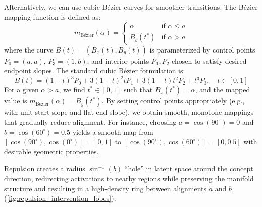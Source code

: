 Alternatively, we can use cubic Bézier curves for smoother transitions. The Bézier mapping function is defined as:
%
\begin{equation}
    m_{\text{Bézier}}(\alpha) =
    \begin{cases}
        \alpha & \text{if } \alpha \leq a \\
        B_y(t^*) & \text{if } \alpha > a
    \end{cases} \label{eq:bezier_mapping_detailed}
\end{equation}
%
where the curve $B(t) = (B_x(t), B_y(t))$ is parameterized by control points $P_0 = (a, a)$, $P_3 = (1, b)$, and interior points $P_1, P_2$ chosen to satisfy desired endpoint slopes. The standard cubic Bézier formulation is:
%
\begin{equation}
    B(t) = (1-t)^3 P_0 + 3(1-t)^2 t P_1 + 3(1-t) t^2 P_2 + t^3 P_3, \quad t \in [0,1] \label{eq:bezier_curve}
\end{equation}
%
For a given $\alpha > a$, we find $t^* \in [0,1]$ such that $B_x(t^*) = \alpha$, and the mapped value is $m_{\text{Bézier}}(\alpha) = B_y(t^*)$. By setting control points appropriately (e.g., with unit start slope and flat end slope), we obtain smooth, monotone mappings that gradually reduce alignment. For instance, choosing $a = \cos(90^\circ) = 0$ and $b = \cos(60^\circ) = 0.5$ yields a smooth map from $[\cos(90^\circ), \cos(0^\circ)] = [0,1]$ to $[\cos(90^\circ), \cos(60^\circ)] = [0, 0.5]$ with desirable geometric properties.

Repulsion creates a radius $\sin^{-1}(b)$ ``hole'' in latent space around the concept direction, redirecting activations to nearby regions while preserving the manifold structure and resulting in a high-density ring between alignments $a$ and $b$ (\cref{fig:repulsion_intervention_lobes}).
